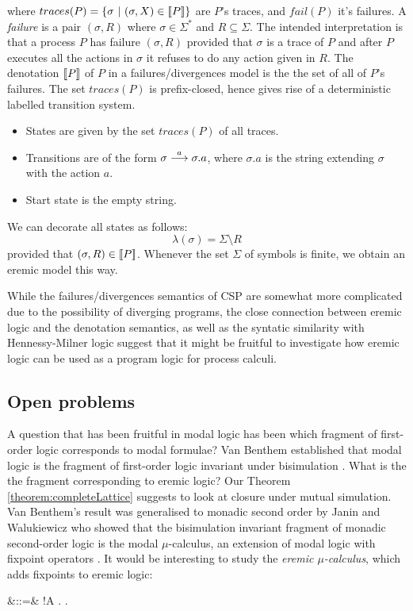 where $traces(P) = \{ \sigma\ |\ (\sigma, X) \in \lbrack\!\lbrack P \rbrack\!\rbrack \}$ are
$P$'s traces, and $fail(P)$ it's failures.  A \emph{failure} is a pair
$(\sigma, R)$ where $\sigma \in \Sigma^*$ and $R \subseteq
\Sigma$. The intended interpretation is that a process $P$ has failure
$(\sigma, R)$ provided that $\sigma$ is a trace of $P$ and after $P$
executes all the actions in $\sigma$ it refuses to do any action given
in $R$. The denotation $\lbrack\!\lbrack P \rbrack\!\rbrack$ of $P$ in a failures/divergences
model is the the set of all of $P$'s failures. The set $ traces(P)$ is
prefix-closed, hence gives rise of a deterministic labelled transition
system.
\begin{itemize}

\item States are given by the set $traces(P)$ of all traces.

\item Transitions are of the form $\sigma \stackrel{a}{\longrightarrow} \sigma.a$, where
  $\sigma.a$ is the string extending $\sigma$ with the action $a$.

\item Start state is the empty string.

\end{itemize}
We can decorate all states as follows:
\[
   \lambda (\sigma) = \Sigma \setminus R
\]
provided that $(\sigma, R) \in \lbrack\!\lbrack P \rbrack\!\rbrack$.  Whenever the set $\Sigma$
of symbols is finite, we obtain an eremic model this way.

While the failures/divergences semantics of CSP are somewhat more
complicated due to the possibility of diverging programs, the close
connection between eremic logic and the denotation semantics, as well
as the syntatic similarity with Hennessy-Milner logic suggest that it
might be fruitful to investigate how eremic logic can be used as a
program logic for process calculi.

\subsection{Open problems} 

A question that has been fruitful in modal logic has been which
fragment of first-order logic corresponds to modal formulae?  Van
Benthem established that modal logic is the fragment of first-order
logic invariant under bisimulation \cite{BlackburnP:modlog}. What is
the the fragment corresponding to eremic logic? Our Theorem
\ref{theorem:completeLattice} suggests to look at closure under mutual
simulation. Van Benthem's result was generalised to monadic second
order by Janin and Walukiewicz \cite{JaninD:expcomotpmcwrtmsol} who
showed that the bisimulation invariant fragment of monadic
second-order logic is the modal $\mu$-calculus, an extension of modal
logic with fixpoint operators \cite{KozenD:respromc}.  It would be
interesting to study the \emph{eremic $\mu$-calculus}, which adds
fixpoints to eremic logic:
\begin{GRAMMAR}
  \phi
     &::=&
  \TRUE
     \VERTICAL
  \phi \AND \psi
     \VERTICAL
  \phi
     \VERTICAL
  !A
     \VERTICAL
  \mu {}.\phi
     \VERTICAL
  \nu {}.\phi
     \VERTICAL
\end{GRAMMAR}

